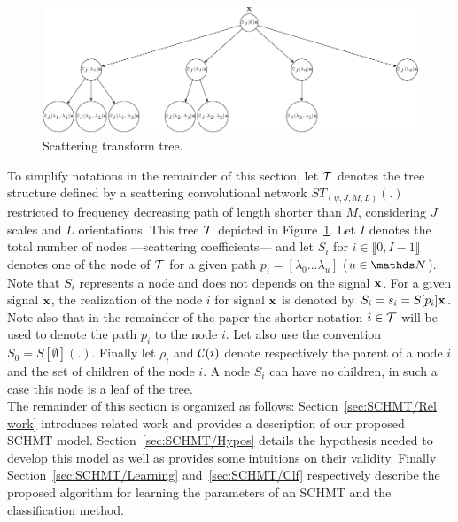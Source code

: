 \documentclass[a4paper,11pt]{report}
\begin{document}
	\begin{figure}[h]
			\begin{center}
				\includegraphics[width=5in]{scat_tree_crop.pdf}
				\caption{Scattering transform tree.}
				\label{fig:ST tree}
			\end{center}
	\end{figure}
  
  To simplify notations in the remainder of this section, let $\mathcal{T}$ denotes the tree structure defined by a scattering convolutional network $ST_{(\psi, J, M, L)}(.)$ restricted to frequency decreasing path of length shorter than $M$, considering $J$ scales and $L$ orientations. This tree $\mathcal{T}$ depicted in Figure~\ref{fig:ST tree}.  Let $I$ denotes the total number of nodes ---\ie scattering coefficients--- and let $S_{i}$ for $i \in \llbracket0, I-1 \rrbracket$ denotes one of the node of $\mathcal{T}$ for a given path $p_{i} = [\lambda_{0} ... \lambda_{u}]$ ($u\in \dsN$). Note that $S_{i}$ represents a node and does not depends on the signal ${\bf x}$. For a given signal ${\bf x}$, the realization of the node $i$ for signal ${\bf x}$ is denoted by $S_{i}= s_{i} = S[p_{i}]{\bf x}$. Note also that in the remainder of the paper the shorter notation $i \in \mathcal{T}$ will be used to denote the path $p_{i}$ to the node $i$. Let also use the convention $S_{0} = S[\emptyset](.)$. Finally let $\rho_{i}$ and $\mathcal{C}(i)$ denote respectively the parent of a node $i$ and the set of children of the node $i$. A node $S_{i}$ can have no children, in such a case this node is a leaf of the tree.\\
  
  The remainder of this section is organized as follows: Section~\ref{sec:SCHMT/Rel work} introduces related work and provides a description of our proposed SCHMT model. Section~\ref{sec:SCHMT/Hypos} details the hypothesis needed to develop this model as well as provides some intuitions on their validity. Finally Section~\ref{sec:SCHMT/Learning} and~\ref{sec:SCHMT/Clf} respectively describe the proposed algorithm for learning the parameters of an SCHMT and the classification method.
\end{document}
